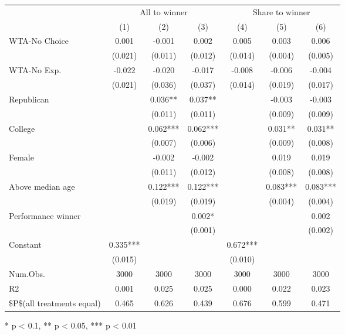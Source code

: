 \begin{table}[t]
\fontsize{12.0pt}{14.4pt}\selectfont
\begin{tabular*}{\linewidth}{@{\extracolsep{\fill}}lcccccc}
\toprule
 & \multicolumn{3}{c}{All to winner} & \multicolumn{3}{c}{Share to winner} \\ 
\cmidrule(lr){2-4} \cmidrule(lr){5-7}
  & (1) & (2) & (3) & (4) & (5) & (6) \\ 
\midrule\addlinespace[2.5pt]
WTA-No Choice & 0.001 & -0.001 & 0.002 & 0.005 & 0.003 & 0.006 \\ 
 & (0.021) & (0.011) & (0.012) & (0.014) & (0.004) & (0.005) \\ 
WTA-No Exp. & -0.022 & -0.020 & -0.017 & -0.008 & -0.006 & -0.004 \\ 
 & (0.021) & (0.036) & (0.037) & (0.014) & (0.019) & (0.017) \\ 
Republican &  & 0.036** & 0.037** &  & -0.003 & -0.003 \\ 
 &  & (0.011) & (0.011) &  & (0.009) & (0.009) \\ 
College &  & 0.062*** & 0.062*** &  & 0.031** & 0.031** \\ 
 &  & (0.007) & (0.006) &  & (0.009) & (0.008) \\ 
Female &  & -0.002 & -0.002 &  & 0.019 & 0.019 \\ 
 &  & (0.011) & (0.012) &  & (0.008) & (0.008) \\ 
Above median age &  & 0.122*** & 0.122*** &  & 0.083*** & 0.083*** \\ 
 &  & (0.019) & (0.019) &  & (0.004) & (0.004) \\ 
Performance winner &  &  & 0.002* &  &  & 0.002 \\ 
 &  &  & (0.001) &  &  & (0.002) \\ 
Constant & 0.335*** &  &  & 0.672*** &  &  \\ 
{} & {(0.015)} & {} & {} & {(0.010)} & {} & {} \\ 
Num.Obs. & 3000 & 3000 & 3000 & 3000 & 3000 & 3000 \\ 
R2 & 0.001 & 0.025 & 0.025 & 0.000 & 0.022 & 0.023 \\ 
\$P\$(all treatments equal) & 0.465 & 0.626 & 0.439 & 0.676 & 0.599 & 0.471 \\ 
\bottomrule
\end{tabular*}
\begin{minipage}{\linewidth}
* p < 0.1, ** p < 0.05, *** p < 0.01\\
\end{minipage}
\end{table}

